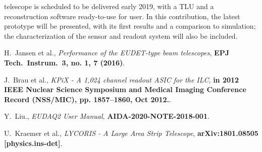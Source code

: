 \lycoris telescope is scheduled to be delivered early 2019, with a TLU and a reconstruction software ready-to-use for user.
In this contribution, the latest \lycoris prototype will be presented, with its first results and a comparison to simulation;
the characterization of the sensor and readout system will also be included.

\footnotesize
\begin{thebibliography}{1}

 H.~Jansen et al., {\em Performance of the EUDET-type beam telescopes},
\textbf{EPJ Tech.\ Instrum.\  {\bf 3}, no. 1, 7 (2016)}.

 J.~Brau et al., {\em KPiX - A 1,024 channel readout ASIC for the ILC},
\textbf{in 2012 IEEE Nuclear Science Symposium and Medical Imaging Conference Record (NSS/MIC), pp. 1857–1860, Oct 2012.}.

 Y.~Liu., {\em EUDAQ2 User Manual},
\textbf{AIDA-2020-NOTE-2018-001}.

 U.~Kraemer et al., {\em LYCORIS - A Large Area Strip Telescope},
\textbf{arXiv:1801.08505 [physics.ins-det]}.


\end{thebibliography}


